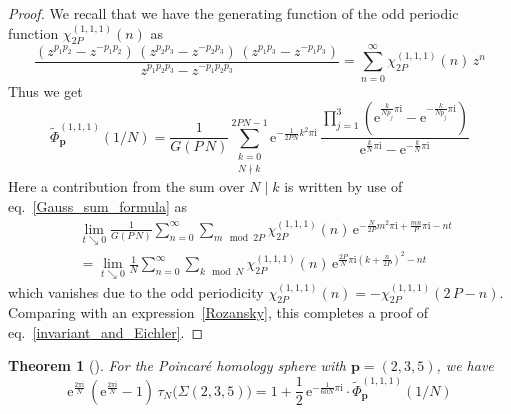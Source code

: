 \documentclass[12pt,reqno]{amsart}
\numberwithin{equation}{section}
\newtheorem{theorem}{Theorem}
\begin{document}
\begin{proof}
  We  recall that we have the generating function of the odd periodic
  function $\chi_{2P}^{(1,1,1)}(n)$ as
  \begin{equation}
    \label{generate_chi_general}
    \frac{
      (z^{p_1 p_2} - z^{-p_1 p_2}) \,
      (z^{p_2 p_3} - z^{-p_2 p_3}) \,
      (z^{p_1 p_3} - z^{-p_1 p_3})
    }{
      z^{p_1 p_2 p_3} - z^{-p_1 p_2 p_3}
    }
    =
    \sum_{n=0}^\infty
    \chi_{2 P}^{(1,1,1)}(n) \, z^{n}
  \end{equation}
  Thus we get
  \begin{equation*}
    \widetilde{\Phi}_{\boldsymbol{p}}^{(1,1,1)}(1/N)
    =
    \frac{1}{G(P \, N)}
    \sum_{\substack{
        k=0 \\
      N \nmid k
    }}^{2 P N-1}
    \mathrm{e}^{- \frac{1}{2 P N} k^2 \pi \mathrm{i}} \,
    \frac{
      \prod_{j=1}^3
      \left(
        \mathrm{e}^{\frac{k}{N p_j} \pi \mathrm{i}}
        -
        \mathrm{e}^{-\frac{k}{N p_j} \pi \mathrm{i}}
      \right)
    }{
      \mathrm{e}^{\frac{k}{N} \pi \mathrm{i}}
      -
      \mathrm{e}^{ -\frac{k}{N} \pi \mathrm{i}}
    }
  \end{equation*}
  Here a contribution from the  sum over $N \mid k$ is written by use of
  eq.~\eqref{Gauss_sum_formula} as
  \begin{align*}
    & \lim_{t \searrow 0} \frac{1}{G(P \, N)}
    \sum_{n=0}^\infty \sum_{m \mod 2 P}
    \chi_{2 P}^{(1,1,1)}(n) \,
    \mathrm{e}^{-\frac{N}{2 P} m^2 \pi \mathrm{i}
      +
      \frac{m n}{P} \pi \mathrm{i} - n t
    }
    \\
    & =
    \lim_{t\searrow 0}
    \frac{1}{N}
    \sum_{n=0}^\infty \sum_{k \mod N}
    \chi_{2 P}^{(1,1,1)}(n) \,
    \mathrm{e}^{\frac{2 P}{N} \pi \mathrm{i}
      \left(
        k+\frac{n}{2P}
      \right)^2
      -n t
    }
  \end{align*}
  which vanishes due to the odd periodicity
  $\chi_{2 P}^{(1,1,1)}(n)
  =
  -
  \chi_{2 P}^{(1,1,1)}(2 \, P-n)$.
  Comparing with an expression~\eqref{Rozansky},
  this completes a proof of eq.~\eqref{invariant_and_Eichler}.
\end{proof}


\begin{theorem}[\cite{LawrZagi99a}]
  For the Poincar{\'e} homology sphere %
  with $\boldsymbol{p} =(2,3,5)$,
  we have 
    \begin{equation}
    \mathrm{e}^{
      \frac{2 \pi \mathrm{i}}{N} 
    } \,
    \left(
      \mathrm{e}^{\frac{2 \pi \mathrm{i}}{N}} - 1
    \right)
    \,    \tau_N \bigl( \Sigma(2,3,5) \bigr)
    =
    1
    +
    \frac{1}{2} \,
    \mathrm{e}^{- \frac{1}{60 N} \pi \mathrm{i}}
    \cdot
    \widetilde{\Phi}_{\boldsymbol{p}}^{(1,1,1)}(1/N)
  \end{equation}
\end{theorem}
\end{document}

